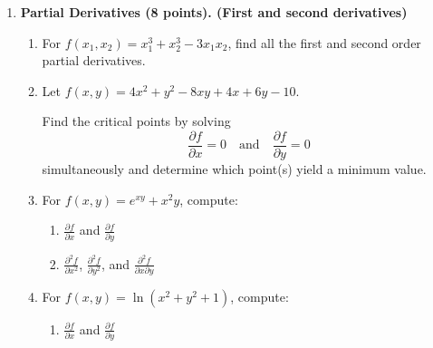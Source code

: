 \documentclass[11pt]{article}
\begin{document}
\begin{enumerate}[label=\arabic*., resume]

    \item \textbf{Partial Derivatives (8 points). (First and second derivatives)}
          \begin{enumerate}[label=(\alph*)]
              \item For \(f(x_1, x_2) = x_1^3 + x_2^3 - 3x_1x_2\), find all the first and second order partial derivatives.

              
              \item Let \( f(x, y) = 4x^2 + y^2 - 8xy + 4x + 6y - 10 \). 
                
                Find the critical points by solving 
                      \[
                          \frac{\partial f}{\partial x} = 0 \quad \text{and} \quad \frac{\partial f}{\partial y} = 0
                      \]
                      simultaneously and determine which point(s) yield a minimum value.


            
              \item For \( f(x, y) = e^{xy} + x^2y \), compute:
                    \begin{enumerate}[label=(\roman*)]
                        \item \(\frac{\partial f}{\partial x}\) and \(\frac{\partial f}{\partial y}\)

                        
                        \item \(\frac{\partial^2 f}{\partial x^2}\), \(\frac{\partial^2 f}{\partial y^2}\), and \(\frac{\partial^2 f}{\partial x \partial y}\)

                        
                    \end{enumerate}
              \item For \( f(x, y) = \ln(x^2 + y^2 + 1) \), compute:
                    \begin{enumerate}[label=(\roman*)]
                        \item \(\frac{\partial f}{\partial x}\) and \(\frac{\partial f}{\partial y}\)

                        

\end{enumerate}
\end{enumerate}
\end{enumerate}
\end{document}
